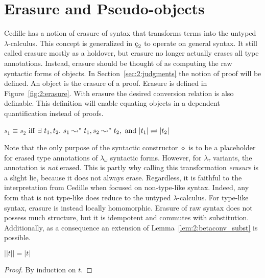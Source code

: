 \section{Erasure and Pseudo-objects}
\label{sec:2:erasure}

Cedille has a notion of erasure of syntax that transforms terms into the untyped $\lambda$-calculus.
This concept is generalized in $\ced$ to operate on general syntax.
It still called erasure mostly as a holdover, but erasure no longer actually erases all type annotations.
Instead, erasure should be thought of as computing the raw syntactic forms of objects.
In Section~\ref{sec:2:judgments} the notion of proof will be defined.
An object is the erasure of a proof.
Erasure is defined in Figure~\ref{fig:2:erasure}.
With erasure the desired conversion relation is also definable.
This definition will enable equating objects in a dependent quantification instead of proofs.

\begin{definition}
    \label{def:2:conv}
    $s_1 \equiv s_2$ iff $\exists\ t_1, t_2.\ s_1 \leadsto^* t_1, s_2 \leadsto^* t_2, \text{ and } |t_1| \rightleftharpoons |t_2|$
\end{definition}



Note that the only purpose of the syntactic constructor $\diamond$ is to be a placeholder for erased type annotations of $\lambda_\omega$ syntactic forms.
However, for $\lambda_\tau$ variants, the annotation is \textit{not} erased.
This is partly why calling this transformation \textit{erasure} is a slight lie, because it does not always erase.
Regardless, it is faithful to the interpretation from Cedille when focused on non-type-like syntax.
Indeed, any form that is not type-like does reduce to the untyped $\lambda$-calculus.
For type-like syntax, erasure is instead locally homomorphic.
Erasure of raw syntax does not possess much structure, but it is idempotent and commutes with substitution.
Additionally, as a consequence an extension of Lemma~\ref{lem:2:betaconv_subst} is possible.

\begin{lemma}
    \label{lem:2:erasure_idempotent}
    $||t|| = |t|$
\end{lemma}
\begin{proof}
    By induction on $t$.
\end{proof}

